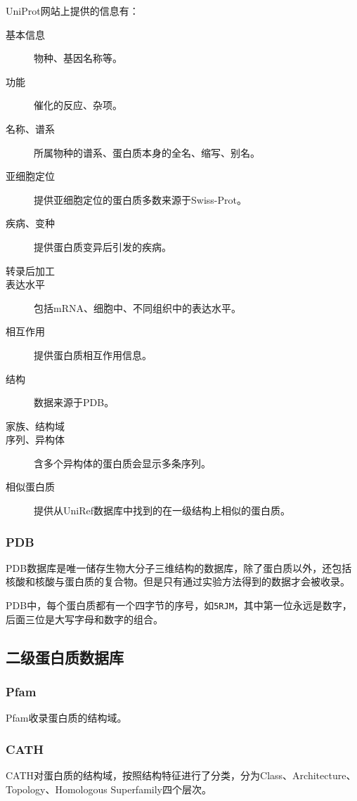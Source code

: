 UniProt网站上提供的信息有：

\begin{description}
	\item [基本信息]物种、基因名称等。
	\item [功能]催化的反应、杂项。
	\item [名称、谱系]所属物种的谱系、蛋白质本身的全名、缩写、别名。
	\item [亚细胞定位] 提供亚细胞定位的蛋白质多数来源于Swiss-Prot。
	\item[疾病、变种] 提供蛋白质变异后引发的疾病。
	\item[转录后加工]
	\item[表达水平] 包括mRNA、细胞中、不同组织中的表达水平。
	\item[相互作用] 提供蛋白质相互作用信息。
	\item[结构] 数据来源于PDB。
	\item[家族、结构域]
	\item[序列、异构体] 含多个异构体的蛋白质会显示多条序列。
	\item[相似蛋白质] 提供从UniRef数据库中找到的在一级结构上相似的蛋白质。
\end{description}

\subsubsection{PDB}

PDB数据库是唯一储存生物大分子三维结构的数据库，除了蛋白质以外，还包括核酸和核酸与蛋白质的复合物。但是只有通过实验方法得到的数据才会被收录。

PDB中，每个蛋白质都有一个四字节的序号，如\texttt{5RJM}，其中第一位永远是数字，后面三位是大写字母和数字的组合。

\subsection{二级蛋白质数据库}

\subsubsection{Pfam}

Pfam收录蛋白质的结构域。

\subsubsection{CATH}

CATH对蛋白质的结构域，按照结构特征进行了分类，分为Class、Architecture、Topology、Homologous Superfamily四个层次。

